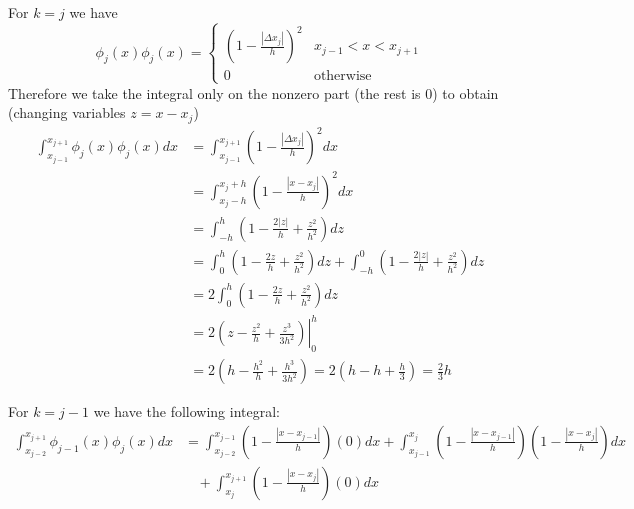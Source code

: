 \documentclass[11pt]{article}
\def\f{\frac }
\begin{document}
\begin{enumerate}
For $k=j$ we have
\begin{equation*} \phi _j (x) \phi_j (x) = \left\{ \begin{array}{cc} \left (1-\f{\left | \Delta x_j \right | }{h}\right ) ^2 & x_{j-1} < x < x_{j+1} \\ 0~~~ & \text{otherwise}\end{array} \right. \end{equation*}
Therefore we take the integral only on the nonzero part (the rest is 0) to obtain (changing variables $z = x-x_j$)
\begin{align*} \int _{x_{j-1}} ^{x_{j+1}} \phi _j (x) \phi_j (x) dx &= \int _{x_{j-1}} ^{x_{j+1}} \left (1-\f{\left | \Delta x_j \right | }{h}\right ) ^2 dx\\ 
&= \int _{x_j-h} ^{x_{j}+h} \left (1-\f{\left | x-x_j \right | }{h}\right ) ^2 dx\\ 
&= \int _{-h} ^{h} \left ( 1-\f{2\left | z \right | }{h} + \f{z^2}{h^2} \right )dz \\ 
&= \int _{0} ^{h} \left ( 1-\f{2z}{h} + \f{z^2}{h^2} \right )dz +\int _{-h} ^{0} \left ( 1-\f{2|z|}{h} + \f{z^2}{h^2} \right )dz \\ 
&= 2\int _{0} ^{h} \left ( 1-\f{2z}{h} + \f{z^2}{h^2} \right )dz \\
&= 2\left .\left ( z-\f{z^2}{h} + \f{z^3}{3h^2} \right )\right | _{0} ^h \\
&= 2\left ( h-\f{h^2}{h} + \f{h^3}{3h^2} \right ) = 2\left ( h-h+ \f{h}{3} \right ) = \f{2}{3} h\end{align*}

For $k=j-1$ we have the following integral:
\begin{align*} \int _{x_{j-2}} ^{x_{j+1}} \phi _{j-1} (x) \phi_j (x) dx &= \int _{x_{j-2}} ^{x_{j-1}} \left ( 1-\f{|x-x_{j-1}|}{h} \right ) ( 0 )dx + \int _{x_{j-1}} ^{x_{j}} \left ( 1- \f{|x-x_{j-1}|}{h}\right ) \left (  1- \f{|x-x_{j}|}{h}\right ) dx\\ &~~~~  + \int _{x_{j}} ^{x_{j+1}} \left ( 1-\f{|x-x_{j}|}{h} \right ) (0) dx \end{align*}



\end{enumerate}
\end{document}
